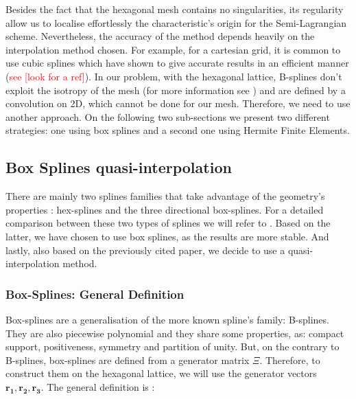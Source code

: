\documentclass[proc]{edpsmath}
\begin{document}
Besides the fact that the hexagonal mesh contains no singularities, its regularity allow us to localise effortlessly the characteristic's origin for the Semi-Lagrangian scheme. Nevertheless, the accuracy of the method depends heavily on the interpolation method chosen. For example, for a cartesian grid, it is common to use cubic splines which have shown to give accurate results in an efficient manner (\textcolor{red}{see [look for a ref]}). In our problem, with the hexagonal lattice, B-splines don't exploit the isotropy of the mesh (for more information see \cite{Mersereau79-IEEE}) and are defined by a convolution on 2D, which cannot be done for our mesh. Therefore, we need to use another approach. On the following two sub-sections we present two different strategies: one using box splines and a second one using Hermite Finite Elements.


\subsection{Box Splines quasi-interpolation}

There are mainly two splines families that take advantage of the geometry's properties : hex-splines and the three directional box-splines. For a detailed comparison between these two types of splines we will refer to \cite{Condat2007}. Based on the latter, we have chosen to use box splines, as the results are more stable. And lastly, also based on the previously cited paper, we decide to use a quasi-interpolation method.

\subsubsection{Box-Splines: General Definition}

Box-splines are a generalisation of the more known spline's family: B-splines. They are also piecewise polynomial and they share some properties, as: compact support, positiveness, symmetry and partition of unity. But, on the contrary to B-splines, box-splines are defined from a generator matrix $\Xi$. Therefore, to construct them on the hexagonal lattice, we will use the generator vectors $\mathbf{r_1, r_2, r_3}$. The general definition is \cite{Boor1993, Condat2006}:
\end{document}

